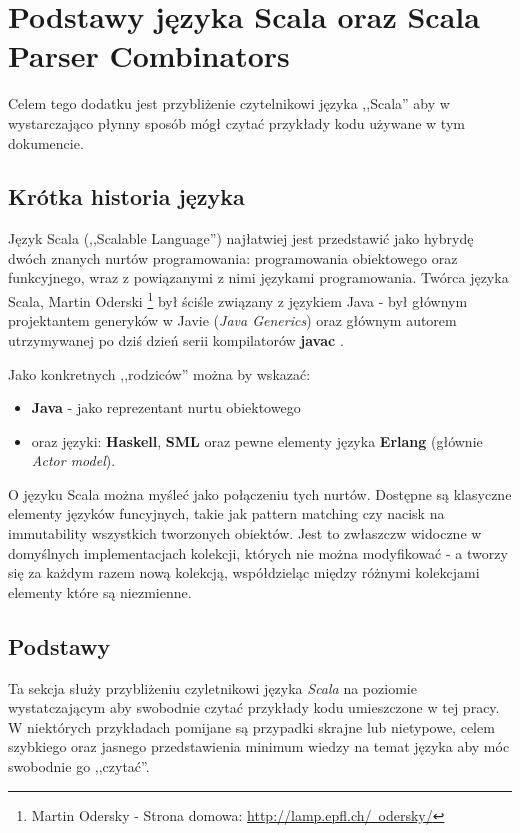 \chapter{Podstawy języka Scala oraz Scala Parser Combinators}
\label{cha:appendixB}
Celem tego dodatku jest przybliżenie czytelnikowi języka ,,Scala'' aby w wystarczająco płynny sposób mógł czytać przykłady kodu używane w tym dokumencie.

\section{Krótka historia języka}
\label{sec:scala_history}
Język Scala (,,Scalable Language'') najłatwiej jest przedstawić jako hybrydę dwóch znanych nurtów programowania: programowania obiektowego oraz funkcyjnego, wraz z 
powiązanymi z nimi językami programowania. Twórca języka Scala, Martin Oderski \footnote{Martin Odersky - Strona domowa: \href{http://lamp.epfl.ch/~odersky/}{http://lamp.epfl.ch/~odersky/}}
był ściśle związany z językiem Java - był głównym projektantem generyków w Javie (\textit{Java Generics}) oraz głównym autorem utrzymywanej po dziś dzień
serii kompilatorów \textbf{javac} \cite{OderskyWywiad}.

Jako konkretnych ,,rodziców'' można by wskazać: 
\begin{itemize}
 \item \textbf{Java} - jako reprezentant nurtu obiektowego 
 \item oraz języki: \textbf{Haskell}, \textbf{SML} oraz pewne elementy języka \textbf{Erlang} (głównie \textit{Actor model}).
\end{itemize}

O języku Scala można myśleć jako połączeniu tych nurtów. Dostępne są klasyczne elementy języków funcyjnych,
takie jak pattern matching czy nacisk na immutability wszystkich tworzonych obiektów. Jest to zwłaszczw widoczne w domyślnych implementacjach
kolekcji, których nie można modyfikować - a tworzy się za każdym razem nową kolekcją, współdzieląc między różnymi kolekcjami elementy które są niezmienne.

\section{Podstawy}
\label{sec:scala_basics}
Ta sekcja służy przybliżeniu czyletnikowi języka \textit{Scala} na poziomie wystatczającym aby swobodnie czytać przykłady
kodu umieszczone w tej pracy. W niektórych przykładach pomijane są przypadki skrajne lub nietypowe, celem szybkiego oraz 
jasnego przedstawienia minimum wiedzy na temat języka aby móc swobodnie go ,,czytać''.

